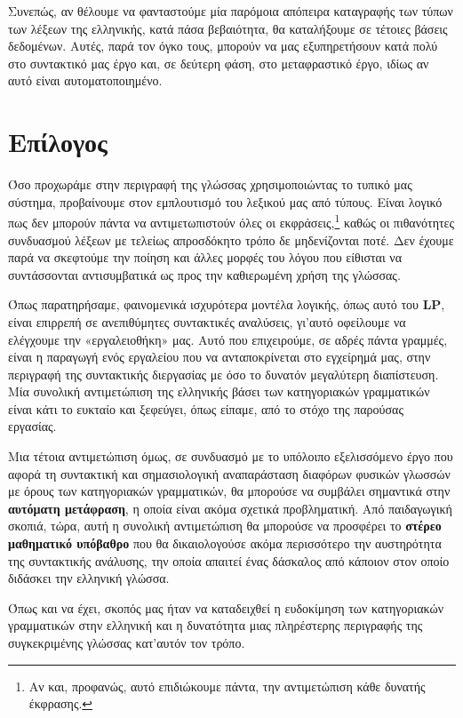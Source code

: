 \documentclass [a4paper,11pt] {book}
\theoremstyle{definition}
\theoremstyle{definition}
\begin{document}
Συνεπώς, αν θέλουμε να φανταστούμε μία παρόμοια απόπειρα καταγραφής των τύπων των λέξεων της ελληνικής, κατά πάσα βεβαιότητα, θα καταλήξουμε σε τέτοιες βάσεις δεδομένων. Αυτές, παρά τον όγκο τους, μπορούν να μας εξυπηρετήσουν κατά πολύ στο συντακτικό μας έργο και, σε δεύτερη φάση, στο μεταφραστικό έργο, ιδίως αν αυτό είναι αυτοματοποιημένο.
\section*{Επίλογος}
Όσο προχωράμε στην περιγραφή της γλώσσας χρησιμοποιώντας το τυπικό μας σύστημα, προβαίνουμε στον εμπλουτισμό του λεξικού μας από τύπους. Είναι λογικό πως δεν μπορούν πάντα να αντιμετωπιστούν όλες οι εκφράσεις,\footnote{Αν και, προφανώς, αυτό επιδιώκουμε πάντα, την αντιμετώπιση κάθε δυνατής έκφρασης.} καθώς οι πιθανότητες συνδυασμού λέξεων με τελείως απροσδόκητο τρόπο δε μηδενίζονται ποτέ. Δεν έχουμε παρά να σκεφτούμε την ποίηση και άλλες μορφές του λόγου που είθισται να συντάσσονται αντισυμβατικά ως προς την καθιερωμένη χρήση της γλώσσας.

Όπως παρατηρήσαμε, φαινομενικά ισχυρότερα μοντέλα λογικής, όπως αυτό του \textbf{LP}, είναι επιρρεπή σε ανεπιθύμητες συντακτικές αναλύσεις, γι'αυτό οφείλουμε να ελέγχουμε την «εργαλειοθήκη» μας. Αυτό που επιχειρούμε, σε αδρές πάντα γραμμές, είναι η παραγωγή ενός εργαλείου που να ανταποκρίνεται στο εγχείρημά μας, στην περιγραφή της συντακτικής διεργασίας με όσο το δυνατόν μεγαλύτερη διαπίστευση. Μία συνολική αντιμετώπιση της ελληνικής βάσει των κατηγοριακών γραμματικών είναι κάτι το ευκταίο και ξεφεύγει, όπως είπαμε, από το στόχο της παρούσας εργασίας.

Μια τέτοια αντιμετώπιση όμως, σε συνδυασμό με το υπόλοιπο εξελισσόμενο έργο που αφορά τη συντακτική και σημασιολογική αναπαράσταση διαφόρων φυσικών γλωσσών με όρους των κατηγοριακών γραμματικών, θα μπορούσε να συμβάλει σημαντικά στην \textbf{αυτόματη μετάφραση}, η οποία είναι ακόμα σχετικά προβληματική. Από παιδαγωγική σκοπιά, τώρα, αυτή η συνολική αντιμετώπιση θα μπορούσε να προσφέρει το \textbf{στέρεο μαθηματικό υπόβαθρο} που θα δικαιολογούσε ακόμα περισσότερο την αυστηρότητα της συντακτικής ανάλυσης, την οποία απαιτεί ένας δάσκαλος από κάποιον στον οποίο διδάσκει την ελληνική γλώσσα.

Όπως και να έχει, σκοπός μας ήταν να καταδειχθεί η ευδοκίμηση των κατηγοριακών γραμματικών στην ελληνική και η δυνατότητα μιας πληρέστερης περιγραφής της συγκεκριμένης γλώσσας κατ'αυτόν τον τρόπο.













\begin{appendices}

\printglossaries 
\hypersetup{linkcolor=black}
\cleardoublepage
{}
{}
\printindex

\end{appendices}
\end{document}
